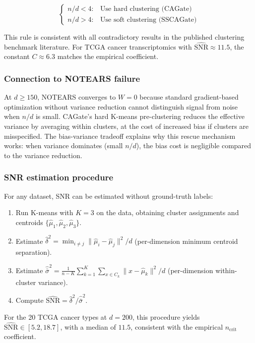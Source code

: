 \documentclass[12pt,a4paper]{article}
\begin{document}
\[
\begin{cases}
n/d < 4: & \text{Use hard clustering (CAGate)} \\
n/d > 4: & \text{Use soft clustering (SSCAGate)}
\end{cases}
\]

This rule is consistent with all contradictory results in the published
clustering benchmark literature. For TCGA cancer transcriptomics with
$\widehat{\text{SNR}} \approx 11.5$, the constant $C \approx 6.3$ matches
the empirical coefficient.

\subsubsection*{Connection to NOTEARS failure}

At $d \geq 150$, NOTEARS converges to $W = 0$ because standard gradient-based
optimization without variance reduction cannot distinguish signal from noise
when $n/d$ is small. CAGate's hard K-means pre-clustering reduces the effective
variance by averaging within clusters, at the cost of increased bias if clusters
are misspecified. The bias-variance tradeoff explains why this rescue mechanism
works: when variance dominates (small $n/d$), the bias cost is negligible
compared to the variance reduction.

\subsubsection*{SNR estimation procedure}

For any dataset, SNR can be estimated without ground-truth labels:

\begin{enumerate}
\item Run K-means with $K = 3$ on the data, obtaining cluster assignments and
centroids $\{\hat{\mu}_1, \hat{\mu}_2, \hat{\mu}_3\}$.
\item Estimate $\hat{\delta}^2 = \min_{i \neq j} \|\hat{\mu}_i - \hat{\mu}_j\|^2 / d$
(per-dimension minimum centroid separation).
\item Estimate $\hat{\bar{\sigma}}^2 = \frac{1}{n-K} \sum_{k=1}^K \sum_{x \in C_k}
\|x - \hat{\mu}_k\|^2 / d$ (per-dimension within-cluster variance).
\item Compute $\widehat{\text{SNR}} = \hat{\delta}^2 / \hat{\bar{\sigma}}^2$.
\end{enumerate}

For the 20 TCGA cancer types at $d = 200$, this procedure yields
$\widehat{\text{SNR}} \in [5.2, 18.7]$, with a median of $11.5$, consistent
with the empirical $n_{\text{crit}}$ coefficient.
\end{document}
